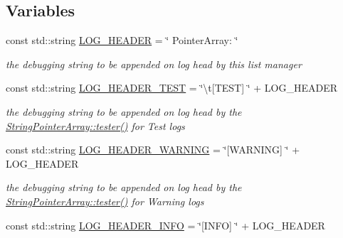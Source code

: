 \subsection*{Variables}
\begin{DoxyCompactItemize}
\item 
\hypertarget{namespaceparray_af364378bce8a0cb4cd0fc4a191684794}{const std\-::string \hyperlink{namespaceparray_af364378bce8a0cb4cd0fc4a191684794}{L\-O\-G\-\_\-\-H\-E\-A\-D\-E\-R} = \char`\"{} Pointer\-Array\-: \char`\"{}}\label{namespaceparray_af364378bce8a0cb4cd0fc4a191684794}

\begin{DoxyCompactList}\small\item\em the debugging string to be appended on log head by this list manager \end{DoxyCompactList}\item 
\hypertarget{namespaceparray_ab57bc1fd35280f9304abbf9755598710}{const std\-::string \hyperlink{namespaceparray_ab57bc1fd35280f9304abbf9755598710}{L\-O\-G\-\_\-\-H\-E\-A\-D\-E\-R\-\_\-\-T\-E\-S\-T} = \char`\"{}\textbackslash{}t\mbox{[}T\-E\-S\-T\mbox{]} \char`\"{} + L\-O\-G\-\_\-\-H\-E\-A\-D\-E\-R}\label{namespaceparray_ab57bc1fd35280f9304abbf9755598710}

\begin{DoxyCompactList}\small\item\em the debugging string to be appended on log head by the \hyperlink{classparray_1_1StringPointerArray_abfac13570bec8c88311714d19ddea59b}{String\-Pointer\-Array\-::tester()} for Test logs \end{DoxyCompactList}\item 
\hypertarget{namespaceparray_a401700c1e4afddc55b1d33cbbc9327db}{const std\-::string \hyperlink{namespaceparray_a401700c1e4afddc55b1d33cbbc9327db}{L\-O\-G\-\_\-\-H\-E\-A\-D\-E\-R\-\_\-\-W\-A\-R\-N\-I\-N\-G} = \char`\"{}\mbox{[}W\-A\-R\-N\-I\-N\-G\mbox{]} \char`\"{} + L\-O\-G\-\_\-\-H\-E\-A\-D\-E\-R}\label{namespaceparray_a401700c1e4afddc55b1d33cbbc9327db}

\begin{DoxyCompactList}\small\item\em the debugging string to be appended on log head by the \hyperlink{classparray_1_1StringPointerArray_abfac13570bec8c88311714d19ddea59b}{String\-Pointer\-Array\-::tester()} for Warning logs \end{DoxyCompactList}\item 
\hypertarget{namespaceparray_ae12e5e44ecdf5808872ebdc05476e93f}{const std\-::string \hyperlink{namespaceparray_ae12e5e44ecdf5808872ebdc05476e93f}{L\-O\-G\-\_\-\-H\-E\-A\-D\-E\-R\-\_\-\-I\-N\-F\-O} = \char`\"{}\mbox{[}I\-N\-F\-O\mbox{]} \char`\"{} + L\-O\-G\-\_\-\-H\-E\-A\-D\-E\-R}\label{namespaceparray_ae12e5e44ecdf5808872ebdc05476e93f}


\end{DoxyCompactItemize}
